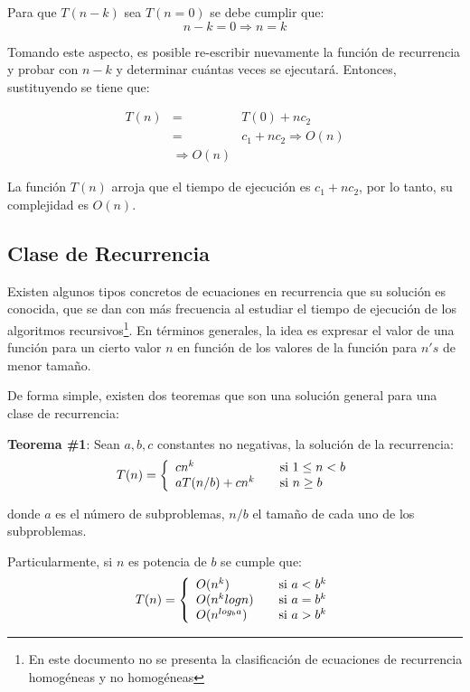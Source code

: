 Para que $T(n-k)$ sea $T(n=0)$ se debe cumplir que:
$$n - k = 0 \Rightarrow n = k$$

Tomando este aspecto, es posible re-escribir nuevamente la función de recurrencia y probar con $n-k$ y determinar cuántas veces se ejecutará. Entonces, sustituyendo se tiene que:

\begin{eqnarray*}
T(n)&=&T(0) + nc_2\\
&=&c_1 + nc_2 \Rightarrow O(n) \\
&\Rightarrow O(n)
\end{eqnarray*}

La función $T(n)$ arroja que el tiempo de ejecución es $c_1 + nc_2$, por lo tanto, su complejidad es $O(n)$.

\subsection{Clase de Recurrencia}

Existen algunos tipos concretos de ecuaciones en recurrencia que su solución es conocida, que se dan con más frecuencia al estudiar el tiempo de ejecución de los algoritmos recursivos\footnote{En este documento no se presenta la clasificación de ecuaciones de recurrencia homogéneas y no homogéneas}. En términos generales, la idea es expresar el valor de una función para un cierto valor $n$ en función de los valores de la función para $n's$ de menor tamaño.

De forma simple, existen dos teoremas que son una solución general para una clase de recurrencia:

\textbf{Teorema \#1}: Sean $a, b, c$ constantes no negativas, la solución de la recurrencia:
\begin{equation}
T(n) = \left\{
  \begin{array}{l l}
    cn^{k} & \quad \text{si $1 \le n < b$}\\
    aT(n/b) + cn^{k}& \quad \text{si $n \ge b$}
  \end{array} \right.
 \end{equation}
 
\noindent donde $a$ es el número de subproblemas, $n/b$ el tamaño de cada uno de los subproblemas.

Particularmente, si $n$ es potencia de $b$ se cumple que:
\begin{equation}
T(n) = \left\{
  \begin{array}{l l}
    O(n^{k}) & \quad \text{si $a < b^{k}$}\\
    O(n^{k}logn) & \quad \text{si $a = b^{k}$}\\
    O(n^{log_b a}) & \quad \text{si $a > b^{k}$}
  \end{array} \right.
\end{equation}

